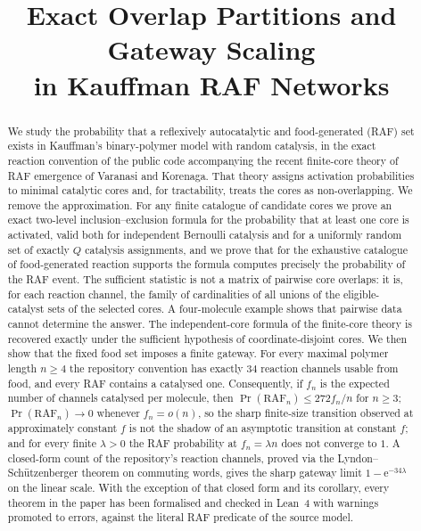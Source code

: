 \documentclass[11pt,a4paper]{article}
\title{Exact Overlap Partitions and Gateway Scaling\\ in Kauffman RAF Networks}
\author{}
\date{}
\theoremstyle{plain}
\theoremstyle{definition}
\theoremstyle{remark}
\newcommand{\RAF}{\mathrm{RAF}}
\renewcommand{\Pr}{\operatorname{Pr}}
\newcommand{\ee}{\mathrm{e}}
\begin{document}
\maketitle

\begin{abstract}
We study the probability that a reflexively autocatalytic and food-generated (RAF) set exists in Kauffman's binary-polymer model with random catalysis, in the exact reaction convention of the public code accompanying the recent finite-core theory of RAF emergence of Varanasi and Korenaga. That theory assigns activation probabilities to minimal catalytic cores and, for tractability, treats the cores as non-overlapping. We remove the approximation. For any finite catalogue of candidate cores we prove an exact two-level inclusion--exclusion formula for the probability that at least one core is activated, valid both for independent Bernoulli catalysis and for a uniformly random set of exactly $Q$ catalysis assignments, and we prove that for the exhaustive catalogue of food-generated reaction supports the formula computes precisely the probability of the RAF event. The sufficient statistic is not a matrix of pairwise core overlaps: it is, for each reaction channel, the family of cardinalities of all unions of the eligible-catalyst sets of the selected cores. A four-molecule example shows that pairwise data cannot determine the answer. The independent-core formula of the finite-core theory is recovered exactly under the sufficient hypothesis of coordinate-disjoint cores. We then show that the fixed food set imposes a finite gateway. For every maximal polymer length $n\ge 4$ the repository convention has exactly $34$ reaction channels usable from food, and every RAF contains a catalysed one. Consequently, if $f_n$ is the expected number of channels catalysed per molecule, then $\Pr(\RAF_n)\le 272 f_n/n$ for $n\ge3$; $\Pr(\RAF_n)\to0$ whenever $f_n=o(n)$, so the sharp finite-size transition observed at approximately constant $f$ is not the shadow of an asymptotic transition at constant $f$; and for every finite $\lambda>0$ the RAF probability at $f_n=\lambda n$ does not converge to $1$. A closed-form count of the repository's reaction channels, proved via the Lyndon--Sch\"utzenberger theorem on commuting words, gives the sharp gateway limit $1-\ee^{-34\lambda}$ on the linear scale. With the exception of that closed form and its corollary, every theorem in the paper has been formalised and checked in Lean~4 with warnings promoted to errors, against the literal RAF predicate of the source model.
\end{abstract}
\end{document}
